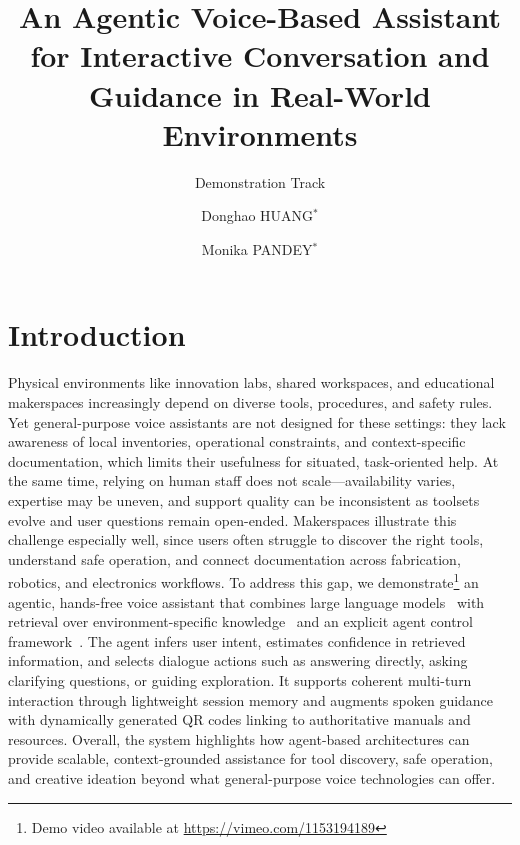 \documentclass[sigconf]{aamas}
\title{An Agentic Voice-Based Assistant for Interactive Conversation and Guidance in Real-World Environments}
\subtitle{Demonstration Track}
\author{Donghao HUANG$^{*}$}
\affiliation{
  \institution{Mastercard}
  \city{Arlington, VA}
  \country{United States}}
\author{Monika PANDEY$^{*}$}
\affiliation{
  \institution{Mastercard}
  \city{Pune}
  \country{India}}
\begin{document}
\pagestyle{fancy}
\fancyhead{}

\maketitle

\renewcommand{\thefootnote}{\fnsymbol{footnote}}
\renewcommand{\thefootnote}{\arabic{footnote}}

\section{Introduction}

Physical environments like innovation labs, shared workspaces, and educational makerspaces increasingly depend on diverse tools, procedures, and safety rules. Yet general-purpose voice assistants are not designed for these settings: they lack awareness of local inventories, operational constraints, and context-specific documentation, which limits their usefulness for situated, task-oriented help. At the same time, relying on human staff does not scale---availability varies, expertise may be uneven, and support quality can be inconsistent as toolsets evolve and user questions remain open-ended. Makerspaces illustrate this challenge especially well, since users often struggle to discover the right tools, understand safe operation, and connect documentation across fabrication, robotics, and electronics workflows. To address this gap, we demonstrate\footnote{Demo video available at \url{https://vimeo.com/1153194189}} an agentic, hands-free voice assistant that combines large language models~\cite{openai2023} with retrieval over environment-specific knowledge~\cite{lewis2020rag} and an explicit agent control framework~\cite{wooldridge2009,russell2021}. The agent infers user intent, estimates confidence in retrieved information, and selects dialogue actions such as answering directly, asking clarifying questions, or guiding exploration. It supports coherent multi-turn interaction through lightweight session memory and augments spoken guidance with dynamically generated QR codes linking to authoritative manuals and resources. Overall, the system highlights how agent-based architectures can provide scalable, context-grounded assistance for tool discovery, safe operation, and creative ideation beyond what general-purpose voice technologies can offer.
\end{document}
